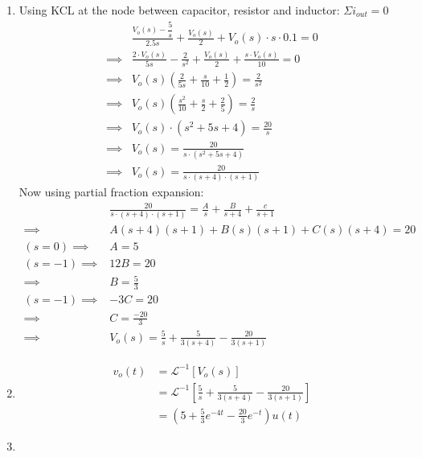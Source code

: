 \begin{enumerate}
	\item{
		Using KCL at the node between capacitor, resistor and inductor: 
		$\Sigma i_{out} = 0$\\
	
		\begin{align*}
		&\frac{V_o(s) - \dfrac{5}{s}}{2.5s} + \frac{V_o(s)}{2} + 
		V_o(s)\cdot s \cdot 0.1 = 0\\
		\implies &\frac{2\cdot V_o(s)}{5s} - \frac{2}{s^2} + 
		\frac{V_o(s)}{2} + \frac{s \cdot V_o(s)}{10} = 0\\
		\implies &V_o(s) \left(\frac{2}{5s} + \frac{s}{10} + 
		\frac{1}{2} \right) = \frac{2}{s^2}\\
		\implies &V_o(s) \left( \frac{s^2}{10} + \frac{s}{2} 
		+ \frac{2}{5} \right) = \frac{2}{s}\\
		\implies &V_o(s) \cdot (s^2 + 5s + 4) = \frac{20}{s}\\
		\implies &V_o(s) = \frac{20}{s\cdot(s^2 + 5s + 4)}\\
		\implies &V_o(s) = \frac{20}{s \cdot (s + 4) \cdot (s + 1)}
		\end{align*}
		Now using partial fraction expansion:
		\begin{align*}
		&\frac{20}{s \cdot (s + 4) \cdot (s + 1)} = \frac{A}{s} 
		+ \frac{B}{s+4} + \frac{c}{s + 1}\\
		\implies &A(s+4)(s+1) + B(s)(s+1) + C(s)(s+4) = 20\\
		(s = 0) \implies &A = 5\\
		(s = -1) \implies &12B = 20\\
		\implies &B = \frac{5}{3}\\
		(s = -1) \implies &-3C =20\\
		\implies &C = \frac{-20}{3} \\
		\implies &V_o(s) = \frac{5}{s} + \frac{5}{3(s+4)} - 
		\frac{20}{3(s+1)} 
		\end{align*}
	}
	\item{
		\begin{align*}
		v_o(t) &= \mathcal{L}^{-1}[V_o(s)]\\
		&= \mathcal{L}^{-1}\left[\frac{5}{s} + \frac{5}{3(s+4)} - 
		\frac{20}{3(s+1)}\right]\\
		&= (5 + \frac{5}{3} e^{-4t} - \frac{20}{3} e^{-t})u(t)
		\end{align*}
	}
	\item{
	}
\end{enumerate}
